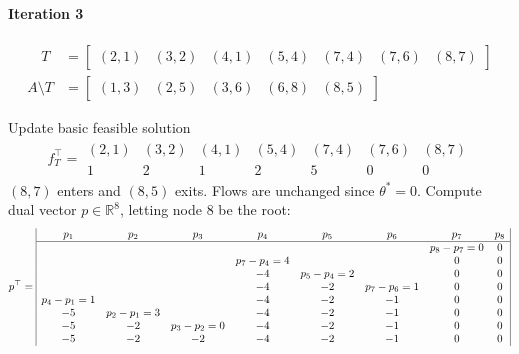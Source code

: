 \documentclass[11pt]{exam}
\begin{document}
\begin{questions}
\begin{parts}
        \paragraph{Iteration 3}
        \begin{align*}
            \quad T &= \begin{bmatrix}
                (2,1) & (3,2) & (4,1) & (5,4) & (7,4) & (7,6) & (8,7)
            \end{bmatrix}\\
            A\setminus T &= \begin{bmatrix}
                (1,3) & (2,5) & (3,6) & (6,8) & (8,5)
            \end{bmatrix}
        \end{align*}
        \begin{subparts}
            \subpart Update basic feasible solution
            \begin{align*}
                f_T^\top = \begin{array}{ccccccc}
                    (2,1) & (3,2) & (4,1) & (5,4) & (7,4) & (7,6) & (8,7)\\
                    \hline
                    1 & 2 & 1 & 2 & 5 & 0 & 0
                \end{array}
            \end{align*}
            $(8,7)$ enters and $(8,5)$ exits. Flows are unchanged since $\theta^* = 0$.
            \subpart Compute dual vector $p \in \mathbb R^{8}$, letting node $8$ be the root:
            {\small
            \begin{align*}
                p^\top = 
                \begin{array}{|cccccccc|}
                  p_1 & p_2 & p_3 & p_4 & p_5 & p_6 & p_7 & p_8\\\hline
                      &     &     &     &     &     & p_8 - p_7 = 0 & 0\\
                      &     &     & p_7 - p_4 = 4 &     &     & 0 & 0\\
                      &     &     & -4 & p_5 - p_4 = 2 &     & 0 & 0\\
                      &     &     & -4 & -2 & p_7 - p_6 = 1 & 0 & 0\\
                  p_4 - p_1 = 1 &     &     & -4 & -2 & -1 & 0 & 0\\
                  -5 & p_2 - p_1 = 3 &     & -4 & -2 & -1 & 0 & 0\\
                  -5 & -2 & p_3 - p_2 = 0 & -4 & -2 & -1 & 0 & 0\\
                  -5 & -2 & -2 & -4 & -2 & -1 & 0 & 0\\
                \end{array}
              \end{align*}
            }


\end{subparts}
\end{parts}
\end{questions}
\end{document}
